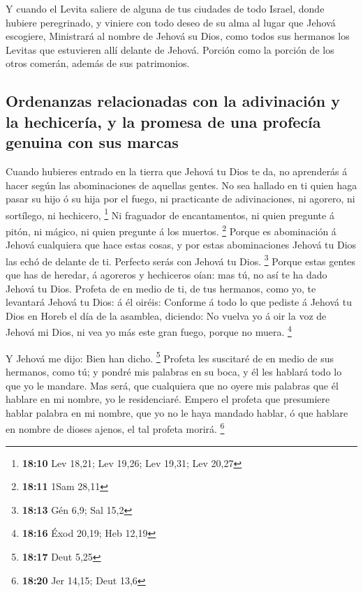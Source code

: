  Y cuando el Levita saliere de alguna de tus ciudades de
todo Israel, donde hubiere peregrinado, y viniere con todo deseo de su
alma al lugar que Jehová escogiere,  Ministrará al nombre de
Jehová su Dios, como todos sus hermanos los Levitas que estuvieren allí
delante de Jehová.  Porción como la porción de los otros
comerán, además de sus patrimonios.

\hypertarget{ordenanzas-relacionadas-con-la-adivinaciuxf3n-y-la-hechiceruxeda-y-la-promesa-de-una-profecuxeda-genuina-con-sus-marcas}{%
\subsection{Ordenanzas relacionadas con la adivinación y la hechicería,
y la promesa de una profecía genuina con sus
marcas}\label{ordenanzas-relacionadas-con-la-adivinaciuxf3n-y-la-hechiceruxeda-y-la-promesa-de-una-profecuxeda-genuina-con-sus-marcas}}

 Cuando hubieres entrado en la tierra que Jehová tu Dios te
da, no aprenderás á hacer según las abominaciones de aquellas gentes.
 No sea hallado en ti quien haga pasar su hijo ó su hija
por el fuego, ni practicante de adivinaciones, ni agorero, ni sortílego,
ni hechicero, \footnote{\textbf{18:10} Lev 18,21; Lev 19,26; Lev 19,31;
  Lev 20,27}  Ni fraguador de encantamentos, ni quien
pregunte á pitón, ni mágico, ni quien pregunte á los muertos.
\footnote{\textbf{18:11} 1Sam 28,11}  Porque es abominación
á Jehová cualquiera que hace estas cosas, y por estas abominaciones
Jehová tu Dios las echó de delante de ti.  Perfecto serás
con Jehová tu Dios. \footnote{\textbf{18:13} Gén 6,9; Sal 15,2}
 Porque estas gentes que has de heredar, á agoreros y
hechiceros oían: mas tú, no así te ha dado Jehová tu Dios. 
Profeta de en medio de ti, de tus hermanos, como yo, te levantará Jehová
tu Dios: á él oiréis:  Conforme á todo lo que pediste á
Jehová tu Dios en Horeb el día de la asamblea, diciendo: No vuelva yo á
oir la voz de Jehová mi Dios, ni vea yo más este gran fuego, porque no
muera. \footnote{\textbf{18:16} Éxod 20,19; Heb 12,19}

 Y Jehová me dijo: Bien han dicho. \footnote{\textbf{18:17}
  Deut 5,25}  Profeta les suscitaré de en medio de sus
hermanos, como tú; y pondré mis palabras en su boca, y él les hablará
todo lo que yo le mandare.  Mas será, que cualquiera que no
oyere mis palabras que él hablare en mi nombre, yo le residenciaré.
 Empero el profeta que presumiere hablar palabra en mi
nombre, que yo no le haya mandado hablar, ó que hablare en nombre de
dioses ajenos, el tal profeta morirá. \footnote{\textbf{18:20} Jer
  14,15; Deut 13,6}

